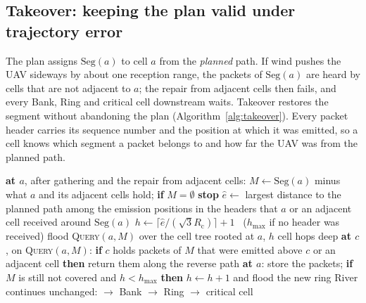 \subsection{Takeover: keeping the plan valid under trajectory error}\label{sec:takeover}
The plan assigns $\mathrm{Seg}(a)$ to \spine{} cell $a$ from the \emph{planned} path. If wind pushes the UAV sideways by
about one reception range, the packets of $\mathrm{Seg}(a)$ are heard by cells that are not adjacent to $a$; the repair
from adjacent cells then fails, and every Bank, Ring and critical cell downstream waits. Takeover restores the segment
without abandoning the plan (Algorithm~\ref{alg:takeover}). Every packet header carries its sequence number and the
position at which it was emitted, so a cell knows which segment a packet belongs to and how far the UAV was from the
planned path.

\begin{algorithm}[t]\caption{\textsc{Takeover} at \spine{} cell $a$ and at a holder cell $c$}\label{alg:takeover}
\begin{algorithmic}[1]\footnotesize
\STATE \textbf{at $a$}, after gathering and the repair from adjacent cells:
\STATE $M\leftarrow\mathrm{Seg}(a)$ minus what $a$ and its adjacent cells hold; \textbf{if} $M=\emptyset$ \textbf{stop}
\STATE $\hat e\leftarrow$ largest distance to the planned path among the emission positions in the headers that $a$ or an
adjacent cell received around $\mathrm{Seg}(a)$
\STATE $h\leftarrow\lceil\hat e/(\sqrt3R_{\mathrm c})\rceil+1$ \ ($h_{\max}$ if no header was received)
\STATE flood \textsc{Query}$(a,M)$ over the cell tree rooted at $a$, $h$ cell hops deep
\STATE \textbf{at $c$}, on \textsc{Query}$(a,M)$: \textbf{if} $c$ holds packets of $M$ that were emitted above $c$ or an
adjacent cell \textbf{then} return them along the reverse path
\STATE \textbf{at $a$}: store the packets; \textbf{if} $M$ is still not covered and $h<h_{\max}$ \textbf{then}
$h\leftarrow h+1$ and flood the new ring
\STATE River continues unchanged: \spine{} $\to$ Bank $\to$ Ring $\to$ critical cell
\end{algorithmic}
\end{algorithm}

